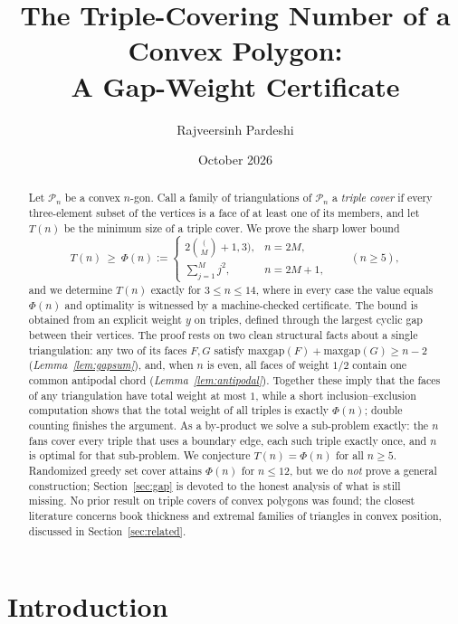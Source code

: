 \documentclass[11pt,a4paper]{article}
\title{\bfseries The Triple-Covering Number of a Convex Polygon:\\
A Gap-Weight Certificate}
\author{Rajveersinh Pardeshi}
\date{October 2026}
\theoremstyle{definition}
\newcommand{\Pol}{\mathcal{P}}
\newcommand{\maxgap}{\mathrm{maxgap}}
\begin{document}
\maketitle

\begin{abstract}
Let $\Pol_n$ be a convex $n$-gon. Call a family of triangulations of $\Pol_n$ a
\emph{triple cover} if every three-element subset of the vertices is a face of at
least one of its members, and let $T(n)$ be the minimum size of a triple cover.
We prove the sharp lower bound
\[
T(n)\ \ge\ \Phi(n) := \begin{cases}
2\binom(M+1,3), & n = 2M,\\[2pt]
\displaystyle\sum_{j=1}^{M} j^2, & n = 2M+1,
\end{cases}
\qquad (n \ge 5),
\]
and we determine $T(n)$ exactly for $3 \le n \le 14$, where in every case the
value equals $\Phi(n)$ and optimality is witnessed by a machine-checked
certificate. The bound is obtained from an explicit weight $y$ on triples,
defined through the largest cyclic gap between their vertices. The proof rests on
two clean structural facts about a single triangulation: any two of its faces
$F, G$ satisfy $\maxgap(F) + \maxgap(G) \ge n-2$ (\emph{Lemma~\ref{lem:gapsum}}),
and, when $n$ is even, all faces of weight $1/2$ contain one common antipodal
chord (\emph{Lemma~\ref{lem:antipodal}}). Together these imply that the faces of
any triangulation have total weight at most $1$, while a short
inclusion--exclusion computation shows that the total weight of all triples is
exactly $\Phi(n)$; double counting finishes the argument. As a by-product we
solve a sub-problem exactly: the $n$ fans cover every triple that uses a
boundary edge, each such triple exactly once, and $n$ is optimal for that
sub-problem. We conjecture $T(n) = \Phi(n)$ for all $n \ge 5$. Randomized greedy
set cover attains $\Phi(n)$ for $n \le 12$, but we do \emph{not} prove a general
construction; Section~\ref{sec:gap} is devoted to the honest analysis of what is
still missing. No prior result on triple covers of convex polygons was found; the
closest literature concerns book thickness and extremal families of triangles in
convex position, discussed in Section~\ref{sec:related}.
\end{abstract}

\section{Introduction}\label{sec:intro}
\end{document}
